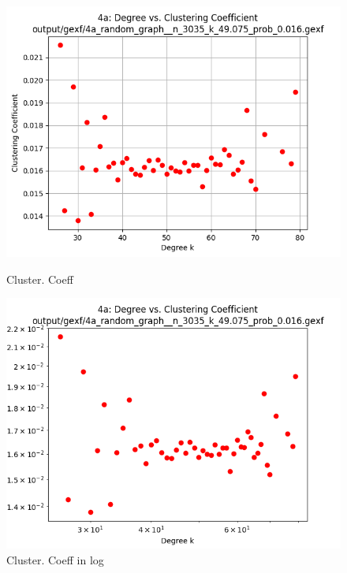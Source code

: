 \documentclass[runningheads]{llncs}
\begin{document}
\begin{figure}
    \centering
    \begin{minipage}{0.5\textwidth}
        \centering
        \includegraphics[width=\textwidth]{4a_clustering_coeff} %
        \caption{Cluster. Coeff}
        \label{fig_4a_clustering_coeff}
    \end{minipage}\hfill
    \begin{minipage}{0.5\textwidth}
        \centering
        \includegraphics[width=\textwidth]{4a_clustering_coeff_log} %
        \caption{Cluster. Coeff in log}
        \label{fig_4a_clustering_coeff_log}
    \end{minipage}
\end{figure}
\end{document}
